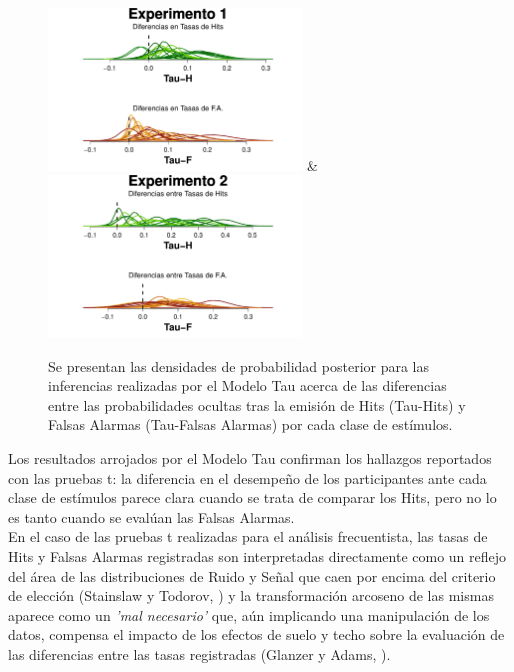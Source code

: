 \begin{figure}[th]
\centering
\includegraphics[width=0.6\textwidth]{Figures/MTau_DensidadTau_E1} \& \includegraphics[width=0.6\textwidth]{Figures/MTau_DensidadTau_E2}\\
\caption[Modelo Tau: Densidades de probabilidad posterior para los valores de los parámetros Tau; Experimentos 1 y 2]{Se presentan las densidades de probabilidad posterior para las inferencias realizadas por el Modelo Tau acerca de las diferencias entre las probabilidades ocultas tras la emisión de Hits (Tau-Hits) y Falsas Alarmas (Tau-Falsas Alarmas) por cada clase de estímulos.}
\label{fig:Tau}
\end{figure}

Los resultados arrojados por el Modelo Tau confirman los hallazgos reportados con las pruebas t: la diferencia en el desempeño de los participantes ante cada clase de estímulos parece clara cuando se trata de comparar los Hits, pero no lo es tanto cuando se evalúan las Falsas Alarmas.\\

En el caso de las pruebas t realizadas para el análisis frecuentista, las tasas de Hits y Falsas Alarmas registradas son interpretadas directamente como un reflejo del área de las distribuciones de Ruido y Señal que caen por encima del criterio de elección (Stainslaw y Todorov, \citeyear{Stainslaw1999}) y la transformación arcoseno de las mismas aparece como un \textit{'mal necesario'} que, aún implicando una manipulación de los datos, compensa el impacto de los efectos de suelo y techo sobre la evaluación de las diferencias entre las tasas registradas (Glanzer y Adams, \citeyear{Glanzer1990}). \\ 

